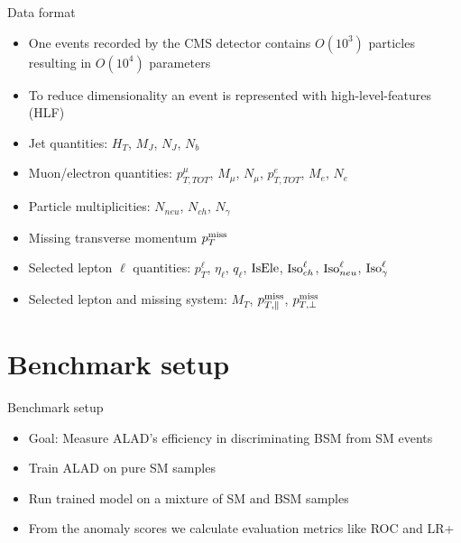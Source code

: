 \documentclass{beamer}
\begin{document}
\begin{frame}{Data format}
  \begin{itemize}
      \item<1-> One events recorded by the CMS detector contains $O(10^3)$ particles resulting in $O(10^4)$ parameters
      \item<2-> To reduce dimensionality an event is represented with high-level-features (HLF)
      \item<3-> Jet quantities: $H_T$, $M_J$, $N_J$, $N_b$
      \item<4-> Muon/electron quantities: $p_{T,TOT}^\mu$, $M_\mu$, $N_\mu$, $p_{T,TOT}^e$, $M_e$, $N_e$
      \item<5-> Particle multiplicities: $N_{neu}$, $N_{ch}$, $N_\gamma$
      \item<6-> Missing transverse momentum $p_T^\textup{miss}$
      \item<7-> Selected lepton $\ell$ quantities: $p_T^\ell$, $\eta_\ell$, $q_\ell$, $\textup{IsEle}$, $\textup{Iso}_{ch}^\ell$, $\textup{Iso}_{neu}^\ell$, $\textup{Iso}_{\gamma}^\ell$
      \item Selected lepton and missing system: $M_T$, $p_{T,\parallel}^\textup{miss}$, $p_{T,\perp}^\textup{miss}$
  \end{itemize}
\end{frame}

\section{Benchmark setup}
\begin{frame}{Benchmark setup}
  \begin{itemize}
      \item<1-> Goal: Measure ALAD's efficiency in discriminating BSM from SM events
      \item<2-> Train ALAD on pure SM samples
      \item<3-> Run trained model on a mixture of SM and BSM samples
      \item<4-> From the anomaly scores we calculate evaluation metrics like ROC and LR+
  \end{itemize}
\end{frame}
\end{document}
